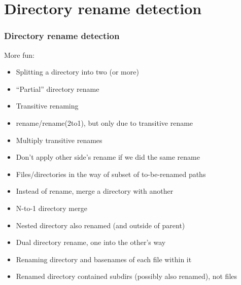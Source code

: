 \documentclass[t]{beamer}
\begin{document}
\section{Directory rename detection}
\begin{frame}
  \frametitle{Directory rename detection}

  More fun:
  \begin{itemize}[<+->]
    \item Splitting a directory into two (or more)
    \item ``Partial'' directory rename

    \item Transitive renaming
    \item rename/rename(2to1), but only due to transitive rename
    \item Multiply transitive renames

    \item Don't apply other side's rename if we did the same rename

    \item Files/directories in the way of subset of to-be-renamed paths

    \item Instead of rename, merge a directory with another
    \item N-to-1 directory merge

    \item Nested directory also renamed (and outside of parent)
    \item Dual directory rename, one into the other's way
    \item Renaming directory and basenames of each file within it
    \item Renamed directory contained subdirs (possibly also renamed), not files

  \end{itemize}

\end{frame}
\end{document}
